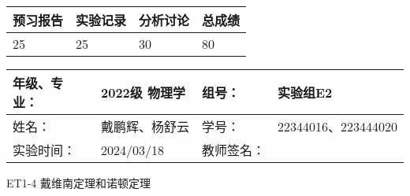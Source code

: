 \documentclass[dvipsnames, svgnames,a4paper,11pt]{article}
\begin{document}
	
	
	
	
	\begin{table}
		\renewcommand\arraystretch{1.7}
		\begin{tabularx}{\textwidth}{
				|X|X|X|X
				|X|X|X|X|}
			\hline
			\multicolumn{2}{|c|}{预习报告}&\multicolumn{2}{|c|}{实验记录}&\multicolumn{2}{|c|}{分析讨论}&\multicolumn{2}{|c|}{总成绩}\\
			\hline
			\LARGE25 & & \LARGE25 & & \LARGE30 & & \LARGE80 & \\
			\hline
		\end{tabularx}
	\end{table}
	
	\begin{table}
		\renewcommand\arraystretch{1.7}
		\begin{tabularx}{\textwidth}{|X|X|X|X|}
			\hline
			年级、专业： & 2022级 物理学 &组号： & 实验组E2\\
			\hline
			姓名： & 戴鹏辉、杨舒云  & 学号： & 22344016、223444020\\
			\hline
			实验时间： & 2024/03/18 & 教师签名： & \\
			\hline
		\end{tabularx}
	\end{table}
	
	\begin{center}
		\LARGE ET1-4 \quad 戴维南定理和诺顿定理
	\end{center}
	
	
\end{document}
